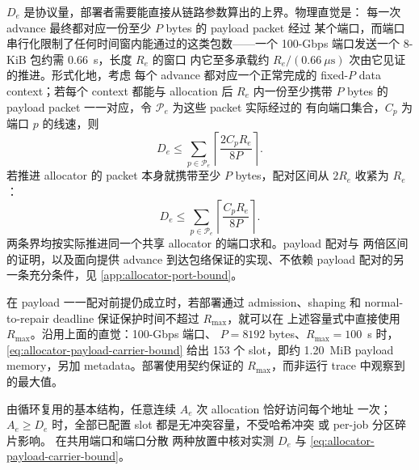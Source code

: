 $D_e$ 是协议量，部署者需要能直接从链路参数算出的上界。物理直觉是：
每一次 advance 最终都对应一份至少 $P$ bytes 的 payload packet 经过
某个端口，而端口串行化限制了任何时间窗内能通过的这类包数——一个
100-Gbps 端口发送一个 8-KiB 包约需 0.66~\textmu s，长度 $R_e$ 的窗口
内它至多承载约 $R_e/(0.66~\mu\mathrm{s})$ 次由它见证的推进。形式化地，考虑
每个 advance 都对应一个正常完成的 fixed-$P$ data context；若每个
context 都能与 allocation 后 $R_e$ 内一份至少携带 $P$ bytes 的
payload packet 一一对应，令 $\mathcal P_e$ 为这些 packet 实际经过的
有向端口集合，$C_p$ 为端口 $p$ 的线速，则
\begin{equation}
 D_e\leq
 \sum_{p\in\mathcal P_e}
 \left\lceil\frac{2C_pR_e}{8P}\right\rceil .
 \label{eq:allocator-directed-port}
\end{equation}
若推进 allocator 的 packet 本身就携带至少 $P$ bytes，配对区间从
$2R_e$ 收紧为 $R_e$：
\begin{equation}
 D_e\leq
 \sum_{p\in\mathcal P_e}
 \left\lceil\frac{C_pR_e}{8P}\right\rceil .
 \label{eq:allocator-payload-carrier-bound}
\end{equation}
两条界均按实际推进同一个共享 allocator 的端口求和。payload 配对与
两倍区间的证明，以及面向提供 advance 到达包络保证的实现、不依赖
payload 配对的另一条充分条件，见 \cref{app:allocator-port-bound}。

在 payload 一一配对前提仍成立时，若部署通过 admission、shaping 和
normal-to-repair deadline 保证保护时间不超过 $R_{\max}$，就可以在
上述容量式中直接使用 $R_{\max}$。沿用上面的直觉：100-Gbps 端口、
$P=8192$ bytes、$R_{\max}=100$~\textmu s 时，
\cref{eq:allocator-payload-carrier-bound} 给出 153 个 slot，即约
1.20~MiB payload memory，另加 metadata。部署使用契约保证的
$R_{\max}$，而非运行 trace 中观察到的最大值。

由循环复用的基本结构，任意连续 $A_e$ 次 allocation 恰好访问每个地址
一次；$A_e\geq D_e$ 时，全部已配置 slot 都是无冲突容量，不受哈希冲突
或 per-job 分区碎片影响。 在共用端口和端口分散
两种放置中核对实测 $D_e$ 与 \cref{eq:allocator-payload-carrier-bound}。
